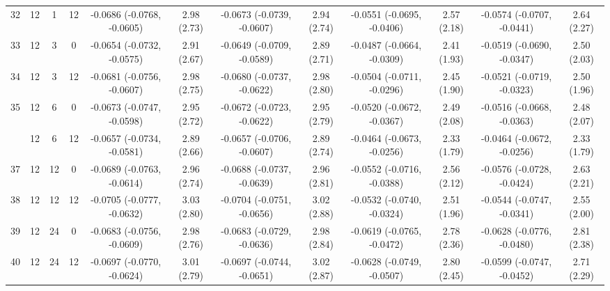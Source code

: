 \begin{table}[!h]
{\begin{tabular}[t]{cccccccccccc}
32 & 12 & 1 & 12 & -0.0686 (-0.0768, -0.0605) & 2.98 (2.73) & -0.0673 (-0.0739, -0.0607) & 2.94 (2.74) & -0.0551 (-0.0695, -0.0406) & 2.57 (2.18) & -0.0574 (-0.0707, -0.0441) & 2.64 (2.27)\\
33 & 12 & 3 & 0 & -0.0654 (-0.0732, -0.0575) & 2.91 (2.67) & -0.0649 (-0.0709, -0.0589) & 2.89 (2.71) & -0.0487 (-0.0664, -0.0309) & 2.41 (1.93) & -0.0519 (-0.0690, -0.0347) & 2.50 (2.03)\\
34 & 12 & 3 & 12 & -0.0681 (-0.0756, -0.0607) & 2.98 (2.75) & -0.0680 (-0.0737, -0.0622) & 2.98 (2.80) & -0.0504 (-0.0711, -0.0296) & 2.45 (1.90) & -0.0521 (-0.0719, -0.0323) & 2.50 (1.96)\\
35 & 12 & 6 & 0 & -0.0673 (-0.0747, -0.0598) & 2.95 (2.72) & -0.0672 (-0.0723, -0.0622) & 2.95 (2.79) & -0.0520 (-0.0672, -0.0367) & 2.49 (2.08) & -0.0516 (-0.0668, -0.0363) & 2.48 (2.07)\\
\addlinespace
36 & 12 & 6 & 12 & -0.0657 (-0.0734, -0.0581) & 2.89 (2.66) & -0.0657 (-0.0706, -0.0607) & 2.89 (2.74) & -0.0464 (-0.0673, -0.0256) & 2.33 (1.79) & -0.0464 (-0.0672, -0.0256) & 2.33 (1.79)\\
37 & 12 & 12 & 0 & -0.0689 (-0.0763, -0.0614) & 2.96 (2.74) & -0.0688 (-0.0737, -0.0639) & 2.96 (2.81) & -0.0552 (-0.0716, -0.0388) & 2.56 (2.12) & -0.0576 (-0.0728, -0.0424) & 2.63 (2.21)\\
38 & 12 & 12 & 12 & -0.0705 (-0.0777, -0.0632) & 3.03 (2.80) & -0.0704 (-0.0751, -0.0656) & 3.02 (2.88) & -0.0532 (-0.0740, -0.0324) & 2.51 (1.96) & -0.0544 (-0.0747, -0.0341) & 2.55 (2.00)\\
39 & 12 & 24 & 0 & -0.0683 (-0.0756, -0.0609) & 2.98 (2.76) & -0.0683 (-0.0729, -0.0636) & 2.98 (2.84) & -0.0619 (-0.0765, -0.0472) & 2.78 (2.36) & -0.0628 (-0.0776, -0.0480) & 2.81 (2.38)\\
40 & 12 & 24 & 12 & -0.0697 (-0.0770, -0.0624) & 3.01 (2.79) & -0.0697 (-0.0744, -0.0651) & 3.02 (2.87) & -0.0628 (-0.0749, -0.0507) & 2.80 (2.45) & -0.0599 (-0.0747, -0.0452) & 2.71 (2.29)\\
\bottomrule
\end{tabular}}
\end{table}
